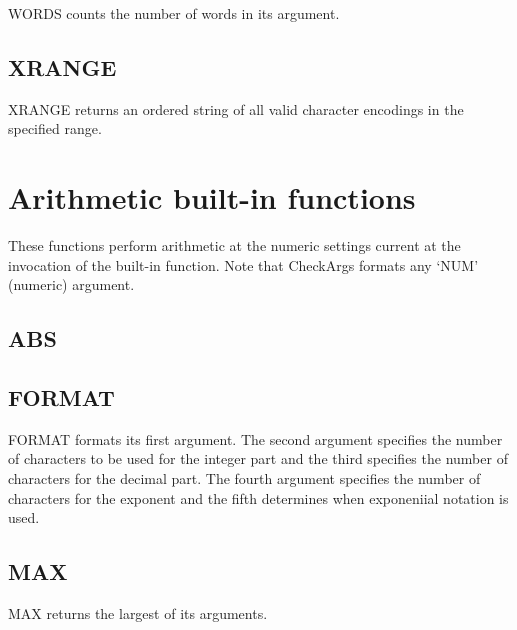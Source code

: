 WORDS counts the number of words in its argument.



\subsection{XRANGE}\label{xrange}

XRANGE returns an ordered string of all valid character encodings in the
specified range.



\section{Arithmetic built-in
functions}\label{arithmetic-built-in-functions}

These functions perform arithmetic at the numeric settings current at
the invocation of the built-in function. Note that CheckArgs formats any
`NUM' (numeric) argument.

\subsection{ABS}\label{abs}



\subsection{FORMAT}\label{format}

FORMAT formats its first argument. The second argument specifies the
number of characters to be used for the integer part and the third
specifies the number of characters for the decimal part. The fourth
argument specifies the number of characters for the exponent and the
fifth determines when exponeniial notation is used.



\subsection{MAX}\label{max}

MAX returns the largest of its arguments.



